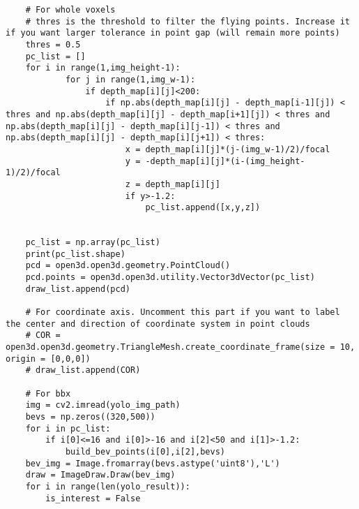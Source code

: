 \begin{lstlisting}
    # For whole voxels
    # thres is the threshold to filter the flying points. Increase it if you want larger tolerance in point gap (will remain more points)
    thres = 0.5
    pc_list = []
    for i in range(1,img_height-1):
            for j in range(1,img_w-1):
                if depth_map[i][j]<200:
                    if np.abs(depth_map[i][j] - depth_map[i-1][j]) < thres and np.abs(depth_map[i][j] - depth_map[i+1][j]) < thres and np.abs(depth_map[i][j] - depth_map[i][j-1]) < thres and np.abs(depth_map[i][j] - depth_map[i][j+1]) < thres:
                        x = depth_map[i][j]*(j-(img_w-1)/2)/focal
                        y = -depth_map[i][j]*(i-(img_height-1)/2)/focal
                        z = depth_map[i][j]
                        if y>-1.2:
                            pc_list.append([x,y,z])


    pc_list = np.array(pc_list)
    print(pc_list.shape)
    pcd = open3d.open3d.geometry.PointCloud()
    pcd.points = open3d.open3d.utility.Vector3dVector(pc_list)
    draw_list.append(pcd)

    # For coordinate axis. Uncomment this part if you want to label the center and direction of coordinate system in point clouds
    # COR = open3d.open3d.geometry.TriangleMesh.create_coordinate_frame(size = 10, origin = [0,0,0])
    # draw_list.append(COR)   
    
    # For bbx
    img = cv2.imread(yolo_img_path)
    bevs = np.zeros((320,500))
    for i in pc_list:
        if i[0]<=16 and i[0]>-16 and i[2]<50 and i[1]>-1.2:
            build_bev_points(i[0],i[2],bevs)
    bev_img = Image.fromarray(bevs.astype('uint8'),'L')
    draw = ImageDraw.Draw(bev_img)   
    for i in range(len(yolo_result)):
        is_interest = False


\end{lstlisting}
